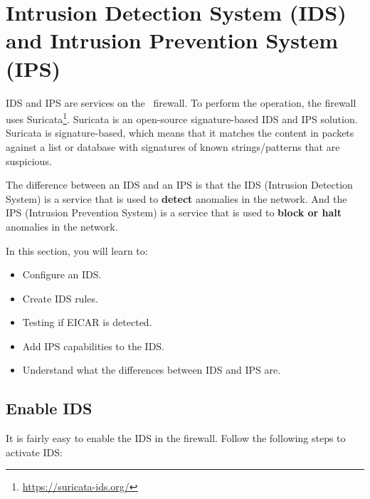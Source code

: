 \newpage

\section{Intrusion Detection System (IDS) and Intrusion Prevention System (IPS)}
IDS and IPS are services on the \opnsense\ firewall. To perform the operation, the firewall uses Suricata\footnote{\url{https://suricata-ids.org/}}. Suricata is an open-source signature-based IDS and IPS solution. Suricata is signature-based, which means that it matches the content in packets against a list or database with signatures of known strings/patterns that are suspicious.

The difference between an IDS and an IPS is that the IDS (Intrusion Detection System) is a service that is used to \textbf{detect} anomalies in the network. And the IPS (Intrusion Prevention System) is a service that is used to \textbf{block or halt} anomalies in the network.

In this section, you will learn to:
\begin{itemize}
    \item Configure an IDS.
    \item Create IDS rules.
    \item Testing if EICAR is detected.
    \item Add IPS capabilities to the IDS.
    \item Understand what the differences between IDS and IPS are.
\end{itemize}

\subsection{Enable IDS}

It is fairly easy to enable the IDS in the firewall. Follow the following steps to activate IDS:


